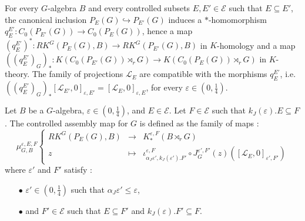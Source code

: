 
For every $G$-algebra $B$ and every controlled subsets $E,E'\in\mathcal E$ such that $E\subseteq E'$, the canonical inclusion $P_E(G)\hookrightarrow P_{E'}(G)$ induces a $*$-homomorphism $q_E^{E'} : C_0(P_{E'}(G))\rightarrow C_0(P_{E}(G))$, hence a map $(q_E^{E'})^* : RK^G(P_E(G),B)\rightarrow RK^G(P_{E'}(G),B)$ in $K$-homology and a map $((q_E^{E'})_G)_* : K(C_0(P_{E'}(G))\rtimes_r G)\rightarrow K(C_0(P_{E}(G))\rtimes_r G)$ in $K$-theory. The family of projections $\mathcal L_E$ are compatible with the morphisms $q_E^{E'}$, i.e. $((q_E^{E'})_G)_*[\mathcal L_{E'},0]_{\varepsilon,E'} = [\mathcal L_{E},0]_{\varepsilon,E}$, for every $\varepsilon\in (0,\frac{1}{4})$.

\begin{definition}
Let $B$ be a $G$-algebra, $\varepsilon\in (0,\frac{1}{4})$, and $E\in\mathcal E$. Let $F\in \mathcal E$ such that $k_J(\varepsilon).E \subseteq F$. The controlled assembly map for $G$ is defined as the family of maps :
\[\mu_{G,B}^{\varepsilon,E,F}\left\{
\begin{array}{rcl}
RK^G(P_E(G), B) & \rightarrow & K_*^{\varepsilon, F}(B\rtimes_r G)\\
z & \mapsto & \iota_{\alpha_J\varepsilon', k_J(\varepsilon').F'}^{\varepsilon,F} \circ J_G^{\varepsilon', F'}(z)([\mathcal L_E,0]_{\varepsilon' , F'})
\end{array}\right.\]
where $\varepsilon'$ and $F'$ satisfy :
\begin{itemize}
\item[$\bullet$] $\varepsilon'\in (0,\frac{1}{4})$ such that $\alpha_J \varepsilon'\leq \varepsilon$,
\item[$\bullet$] and $F'\in\mathcal E$ such that $E\subseteq F'$ and $k_J(\varepsilon).F'\subseteq F$.
\end{itemize}
\end{definition}


